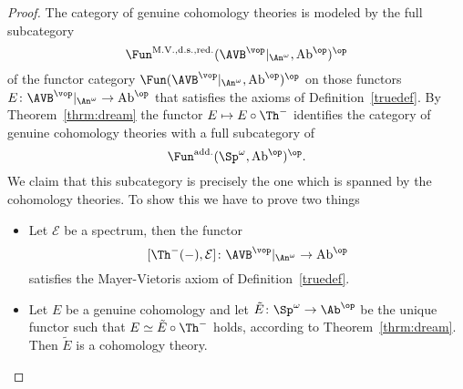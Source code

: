 \begin{proof}
    The category of genuine cohomology theories is modeled 
    by the full subcategory 
    \[
      \Fun^{\mathrm{M.V., d.s., red.}}(\AVB^\vop|_{\An^\omega}, \mathrm{Ab}^\op)^\op  
    \]
    of the functor category $\Fun(\AVB^\vop|_{\An^\omega}, \mathrm{Ab}^\op)^\op$ on those functors 
    $E \colon \AVB^\vop|_{\An^\omega} \to \mathrm{Ab}^\op$ that satisfies the axioms of Definition~\ref{truedef}.
    By Theorem~\ref{thrm:dream} the functor $E \mapsto E \circ \Th^-$ identifies the category of genuine cohomology 
    theories with a full subcategory of 
    \[
        \Fun^{\mathrm{add.}}(\Sp^\omega, \mathrm{Ab}^\op)^\op.
    \]
    We claim that this subcategory is precisely the one which is spanned by the cohomology theories.
    To show this we have to prove two things 
    \begin{itemize}
        \item Let $\mathcal E$ be a spectrum, then the functor 
            \[
                [\Th^-(-), \mathcal E] \colon \AVB^\vop|_{\An^\omega} \to \mathrm{Ab}^\op
            \]
            satisfies the Mayer-Vietoris axiom of Definition~\ref{truedef}.
        \item Let $E$ be a genuine cohomology and let $\tilde E \colon \Sp^\omega \to \Ab^\op$
              be the unique functor such that $E \simeq \tilde E \circ \Th^-$ holds, according to Theorem~\ref{thrm:dream}.
              Then $\tilde E$ is a cohomology theory.


\end{itemize}
\end{proof}

